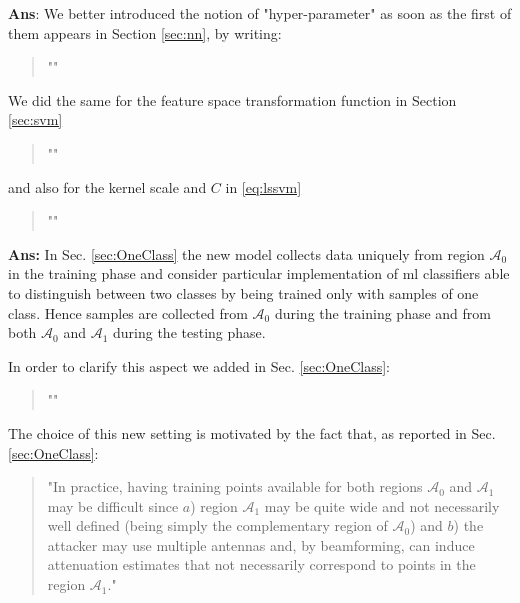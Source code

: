 \documentclass[draftcls,onecolumn,12pt]{IEEEtran}
\newcounter{revc}
\newcommand{\revp}[1]{\zref[revcontent]{#1}}
\newcommand{\A}[1]{\mathcal{A}_#1}
\begin{document}
\vspace{5mm} %
\begin{framed}
\end{framed}

{\bf Ans}: We better introduced the notion of "hyper-parameter" as soon as the first of them appears in Section \ref{sec:nn}, by writing:
\begin{quote}
	"\revp{hyper1}"
\end{quote}
We did the same for the feature space transformation function in Section \ref{sec:svm}
\begin{quote}
	"\revp{hyper2}"
\end{quote}
 and also for the kernel scale and $C$ in \eqref{eq:lssvm}
 \begin{quote}
 	"\revp{hyper3}"
 \end{quote} 

\vspace{5mm} %
\begin{framed}
\end{framed}

{\bf Ans:} In Sec. \ref{sec:OneClass} the new model collects data uniquely from region $\mathcal{A}_0$ in the training phase and consider particular implementation of \ac{ml} classifiers able to distinguish between two classes by being trained only with samples of one class. Hence samples are collected from $\mathcal{A}_0$ during the training phase and from both $\mathcal{A}_0$ and $\mathcal{A}_1$ during the testing phase. 

In order to clarify this aspect we added in Sec. \ref{sec:OneClass}:
\begin{quote}
"\revp{oneClass}"
\end{quote}

The choice of this new setting is motivated by the fact that, as reported in Sec. \ref{sec:OneClass}:
\begin{quote}
"In practice, having training points available for both regions $\mathcal A_0$ and ${\mathcal A}_1$ may be difficult since $a$) region $\A{1}$ may be quite wide and not necessarily well defined (being simply the complementary region of $\mathcal A_0$) and $b$) the attacker may use multiple antennas and, by beamforming, can induce attenuation estimates that not necessarily correspond to points in the region $\A{1}$."
\end{quote}
\end{document}
